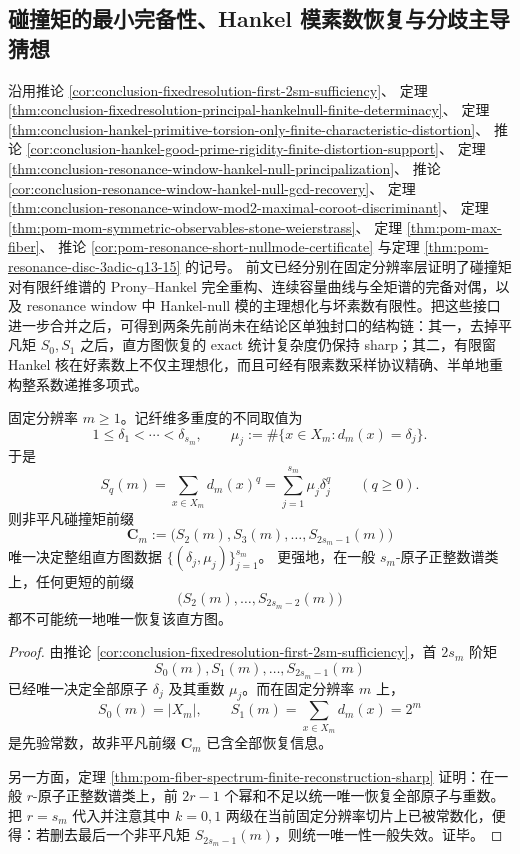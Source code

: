 \subsection{碰撞矩的最小完备性、Hankel 模素数恢复与分歧主导猜想}\label{subsec:conclusion-moment-determinacy-hankel-goodprime-recovery-discriminant}
沿用推论 \ref{cor:conclusion-fixedresolution-first-2sm-sufficiency}、
定理 \ref{thm:conclusion-fixedresolution-principal-hankelnull-finite-determinacy}、
定理 \ref{thm:conclusion-hankel-primitive-torsion-only-finite-characteristic-distortion}、
推论 \ref{cor:conclusion-hankel-good-prime-rigidity-finite-distortion-support}、
定理 \ref{thm:conclusion-resonance-window-hankel-null-principalization}、
推论 \ref{cor:conclusion-resonance-window-hankel-null-gcd-recovery}、
定理 \ref{thm:conclusion-resonance-window-mod2-maximal-coroot-discriminant}、
定理 \ref{thm:pom-mom-symmetric-observables-stone-weierstrass}、
定理 \ref{thm:pom-max-fiber}、
推论 \ref{cor:pom-resonance-short-nullmode-certificate}
与定理 \ref{thm:pom-resonance-disc-3adic-q13-15} 的记号。
前文已经分别在固定分辨率层证明了碰撞矩对有限纤维谱的 Prony--Hankel 完全重构、连续容量曲线与全矩谱的完备对偶，以及 resonance window 中 Hankel-null 模的主理想化与坏素数有限性。把这些接口进一步合并之后，可得到两条先前尚未在结论区单独封口的结构链：其一，去掉平凡矩 \(S_0,S_1\) 之后，直方图恢复的 exact 统计复杂度仍保持 sharp；其二，有限窗 Hankel 核在好素数上不仅主理想化，而且可经有限素数采样协议精确、半单地重构整系数递推多项式。

\begin{theorem}[固定分辨率直方图的最小完备碰撞统计量]\label{thm:conclusion-fixedresolution-nontrivial-collision-minimal-complete-statistic}
固定分辨率 \(m\ge 1\)。记纤维多重度的不同取值为
\[
1\le \delta_1<\cdots<\delta_{s_m},
\qquad
\mu_j:=\#\{x\in X_m:d_m(x)=\delta_j\}.
\]
于是
\[
S_q(m)=\sum_{x\in X_m}d_m(x)^q=\sum_{j=1}^{s_m}\mu_j\delta_j^q
\qquad(q\ge 0).
\]
则非平凡碰撞矩前缀
\[
\mathbf C_m:=
\bigl(S_2(m),S_3(m),\dots,S_{2s_m-1}(m)\bigr)
\]
唯一决定整组直方图数据
\(
\{(\delta_j,\mu_j)\}_{j=1}^{s_m}
\)。
更强地，在一般 \(s_m\)-原子正整数谱类上，任何更短的前缀
\[
\bigl(S_2(m),\dots,S_{2s_m-2}(m)\bigr)
\]
都不可能统一地唯一恢复该直方图。
\end{theorem}
\begin{proof}
由推论 \ref{cor:conclusion-fixedresolution-first-2sm-sufficiency}，首 \(2s_m\) 阶矩
\[
S_0(m),S_1(m),\dots,S_{2s_m-1}(m)
\]
已经唯一决定全部原子 \(\delta_j\) 及其重数 \(\mu_j\)。而在固定分辨率 \(m\) 上，
\[
S_0(m)=|X_m|,
\qquad
S_1(m)=\sum_{x\in X_m}d_m(x)=2^m
\]
是先验常数，故非平凡前缀 \(\mathbf C_m\) 已含全部恢复信息。

另一方面，定理 \ref{thm:pom-fiber-spectrum-finite-reconstruction-sharp} 证明：在一般 \(r\)-原子正整数谱类上，前 \(2r-1\) 个幂和不足以统一唯一恢复全部原子与重数。把 \(r=s_m\) 代入并注意其中 \(k=0,1\) 两级在当前固定分辨率切片上已被常数化，便得：若删去最后一个非平凡矩 \(S_{2s_m-1}(m)\)，则统一唯一性一般失效。证毕。
\end{proof}

